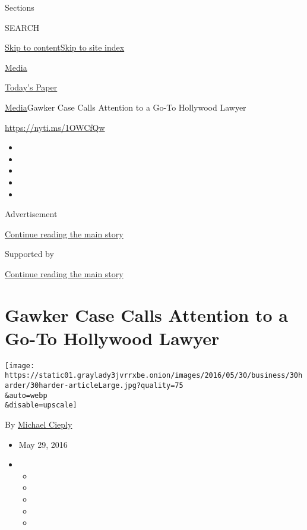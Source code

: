 Sections

SEARCH

\protect\hyperlink{site-content}{Skip to
content}\protect\hyperlink{site-index}{Skip to site index}

\href{https://www.nytimes3xbfgragh.onion/pages/business/media/index.html}{Media}

\href{https://myaccount.nytimes3xbfgragh.onion/auth/login?response_type=cookie\&client_id=vi}{}

\href{https://www.nytimes3xbfgragh.onion/section/todayspaper}{Today's
Paper}

\href{/pages/business/media/index.html}{Media}\textbar{}Gawker Case
Calls Attention to a Go-To Hollywood Lawyer

\url{https://nyti.ms/1OWCfQw}

\begin{itemize}
\item
\item
\item
\item
\item
\end{itemize}

Advertisement

\protect\hyperlink{after-top}{Continue reading the main story}

Supported by

\protect\hyperlink{after-sponsor}{Continue reading the main story}

\hypertarget{gawker-case-calls-attention-to-a-go-to-hollywood-lawyer}{%
\section{Gawker Case Calls Attention to a Go-To Hollywood
Lawyer}\label{gawker-case-calls-attention-to-a-go-to-hollywood-lawyer}}

\texttt{[image: https://static01.graylady3jvrrxbe.onion/images/2016/05/30/business/30harder/30harder-articleLarge.jpg?quality=75\\\&auto=webp\\\&disable=upscale]}

By \href{http://www.nytimes3xbfgragh.onion/by/michael-cieply}{Michael
Cieply}

\begin{itemize}
\item
  May 29, 2016
\item
  \begin{itemize}
  \item
  \item
  \item
  \item
  \item
  \end{itemize}
\end{itemize}

